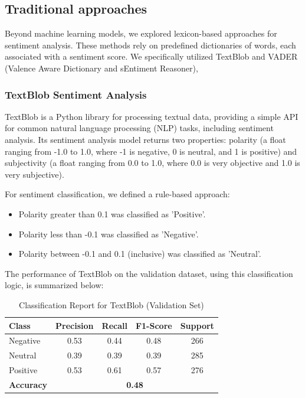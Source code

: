 \subsection{ Traditional approaches}

Beyond machine learning models, we explored lexicon-based approaches for sentiment analysis. These methods rely on predefined dictionaries of words, each associated with a sentiment score. We specifically utilized TextBlob and VADER (Valence Aware Dictionary and sEntiment Reasoner),


\subsubsection{ \textbf{TextBlob Sentiment Analysis}}

TextBlob is a Python library for processing textual data, providing a simple API for common natural language processing (NLP) tasks, including sentiment analysis. Its sentiment analysis model returns two properties: polarity (a float ranging from -1.0 to 1.0, where -1 is negative, 0 is neutral, and 1 is positive) and subjectivity (a float ranging from 0.0 to 1.0, where 0.0 is very objective and 1.0 is very subjective).

For sentiment classification, we defined a rule-based approach:
\begin{itemize}
    \item Polarity greater than 0.1 was classified as 'Positive'.
    \item Polarity less than -0.1 was classified as 'Negative'.
    \item Polarity between -0.1 and 0.1 (inclusive) was classified as 'Neutral'.
\end{itemize}

The performance of TextBlob on the validation dataset, using this classification logic, is summarized below:

\begin{table}[H]
\centering
\caption{Classification Report for TextBlob (Validation Set)}
\begin{tabular}{|l|c|c|c|c|}
\hline
\textbf{Class} & \textbf{Precision} & \textbf{Recall} & \textbf{F1-Score} & \textbf{Support} \\
\hline
Negative & 0.53 & 0.44 & 0.48 & 266 \\
Neutral  & 0.39 & 0.39 & 0.39 & 285 \\
Positive & 0.53 & 0.61 & 0.57 & 276 \\
\hline
\textbf{Accuracy} & \multicolumn{4}{|c|}{\textbf{0.48}} \\
\hline
\end{tabular}
\label{tab:textblob_validation_report}
\end{table}

